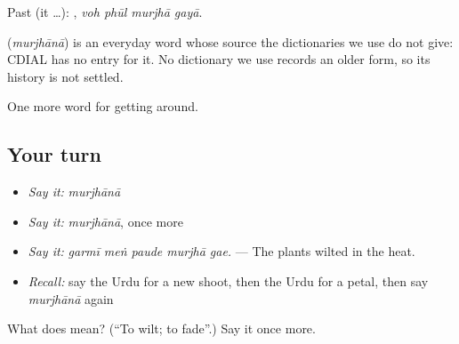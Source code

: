 Past (it …):    , \emph{voh phūl murjhā gayā}.

\begin{cousinweb}
\textbf{} (\emph{murjhānā}) is an everyday word whose source the dictionaries we use do not give: CDIAL has no entry for it. No dictionary we use records an older form, so its history is not settled.
\end{cousinweb}

\begin{grammarlens}[title={What you've built}]
One more word for getting around.
\end{grammarlens}

\subsection*{Your turn}
\begin{itemize}
\raggedright
  \item \emph{Say it:} \emph{murjhānā}
  \item \emph{Say it:} \emph{murjhānā}, once more
  \item \emph{Say it:} \emph{garmī meṅ paude murjhā gae.} — The plants wilted in the heat.
  \item \emph{Recall:} say the Urdu for a new shoot, then the Urdu for a petal, then say \emph{murjhānā} again
\end{itemize}

\begin{tcolorbox}[breakable,colback=teal!4,colframe=teal!35!black,title={Before you move on}]
What does  mean? (\textquotedblleft{}To wilt; to fade\textquotedblright{}.) Say it once more.
\end{tcolorbox}
